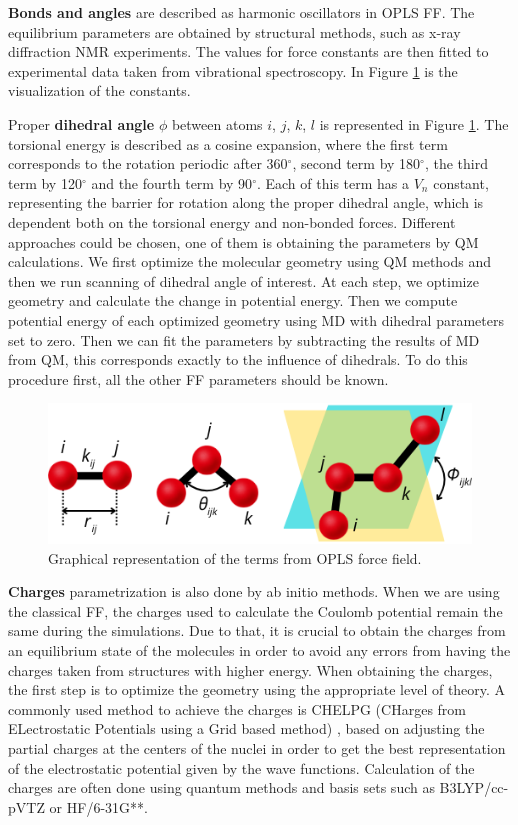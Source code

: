 \textbf{Bonds and angles} are described as harmonic oscillators in OPLS FF. The equilibrium parameters are obtained by structural methods, such as x-ray diffraction NMR experiments. The values for force constants are then fitted to experimental data taken from vibrational spectroscopy. In Figure \ref{fig:torsion} is the visualization of the constants.

Proper \textbf{dihedral angle} $\phi$ between atoms $i$, $j$, $k$, $l$ is represented in Figure \ref{fig:torsion}. The torsional energy is described as a cosine expansion, where the first term corresponds to the rotation periodic after 360$^\circ$, second term by 180$^\circ$, the third term by 120$^\circ$ and the fourth term by 90$^\circ$. Each of this term has a $V_n$ constant, representing the barrier for rotation along the proper dihedral angle, which is dependent both on the torsional energy and non-bonded forces. Different approaches could be chosen, one of them is obtaining the parameters by QM calculations. \cite{mackerell_empirical_2004} We first optimize the molecular geometry using QM methods and then we run scanning of dihedral angle of interest. At each step, we optimize geometry and calculate the change in potential energy.  Then we compute potential energy of each optimized geometry using MD with dihedral parameters set to zero. Then we can fit the parameters by subtracting the results of MD from QM, this corresponds exactly to the influence of dihedrals. To do this procedure first, all the other FF parameters should be known. 
\vspace{-0.2cm}
\begin{figure}[H]
	\centering
	\includegraphics[width=0.60\linewidth]{img/uhly_canva.png} 
\vspace{-0.2cm}
\caption{Graphical representation of the terms from OPLS force field.}
\label{fig:torsion}  
\end{figure}
\vspace{-0.5cm}

\textbf{Charges} parametrization is also done by ab initio methods. When we are using the classical FF, the charges used to calculate the Coulomb potential remain the same during the simulations. Due to that, it is crucial to obtain the charges from an equilibrium state of the molecules in order to avoid any errors from having the charges taken from structures with higher energy. When obtaining the charges, the first step is to optimize the geometry using the appropriate level of theory. A commonly used method to achieve the charges is CHELPG (CHarges from ELectrostatic Potentials using a Grid based method) \cite{breneman_determining_1990}, based on adjusting the partial charges at the centers of the nuclei in order to get the best representation of the electrostatic potential given by the wave functions. Calculation of the charges are often done using quantum methods and basis sets such as B3LYP/cc-pVTZ or HF/6-31G**.

